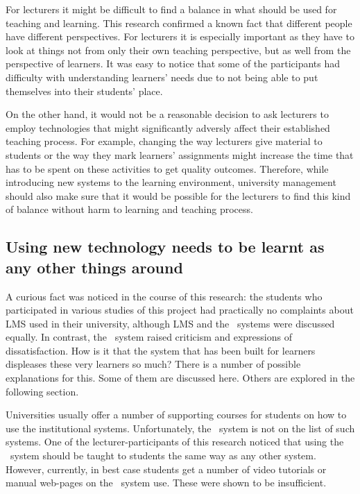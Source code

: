 For lecturers it might be difficult to find a balance in what should be used for
teaching and learning. This research confirmed a known fact that different
people have different perspectives. For lecturers it is especially important as
they have to look at things not from only their own teaching perspective, but as
well from the perspective of learners. It was easy to notice that some of the
participants had difficulty with understanding learners' needs due to not being
able to put themselves into their students' place.

On the other hand, it would not be a reasonable decision to ask lecturers to
employ technologies that might significantly adversly affect their established
teaching process. For example, changing the way lecturers give material to
students or the way they mark learners' assignments might increase the time that
has to be spent on these activities to get quality outcomes. Therefore, while
introducing new systems to the learning environment, university management
should also make sure that it would be possible for the lecturers to find this
kind of balance without harm to learning and teaching process.

\subsection[Learning to Use Technology]{Using new technology needs to be learnt
as any other things around}

A curious fact was noticed in the course of this research: the students who
participated in various studies of this project had practically no complaints
about LMS used in their university, although LMS and the \ep~systems were
discussed equally. In contrast, the \ep~system raised criticism and expressions
of dissatisfaction. How is it that the system that has been built for learners
displeases these very learners so much? There is a number of possible
explanations for this. Some of them are discussed here. Others are explored in
the following section.

Universities usually offer a number of supporting courses for students on how to
use the institutional systems. Unfortunately, the \ep~system is not on the list
of such systems. One of the lecturer-participants of this research noticed that
using the \ep~system should be taught to students the same way as any other
system. However, currently, in best case students get a number of video tutorials
or manual web-pages on the \ep~system use. These were shown to be insufficient. 

